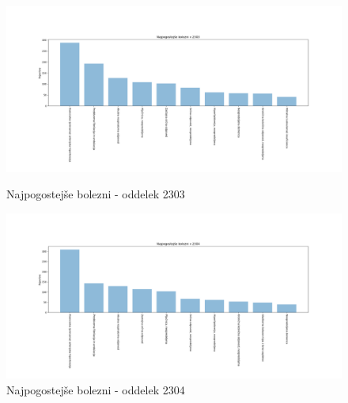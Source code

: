 \documentclass[a4paper,12pt]{report}
\begin{document}
\begin{center}
   \begin{figure}[!htb]
      \centering
         \begin{minipage}[b]{0.4\textwidth}
            \noindent\includegraphics[width=\linewidth]{./grafi/2303.png}
            \caption{Najpogostejše bolezni - oddelek 2303}
         \end{minipage}
         \hfill
         \begin{minipage}[b]{0.4\textwidth}
            \noindent\includegraphics[width=\linewidth]{./grafi/2304.png}
            \caption{Najpogostejše bolezni - oddelek 2304}
         \end{minipage}
   \end{figure}


\end{center}
\end{document}
